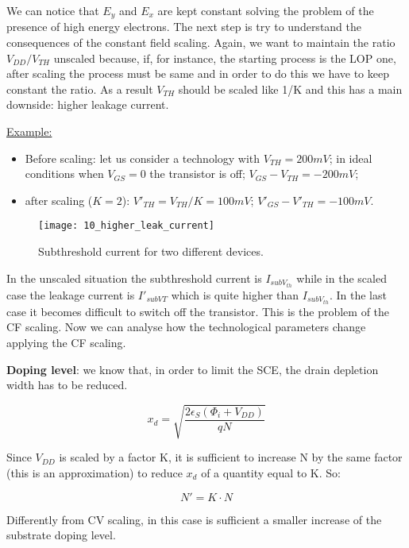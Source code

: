 \documentclass[a4paper, 12pt, twoside, openright]{report}
\begin{document}
\begin{enumerate}
We can notice that $E_{y}$ and $E_{x}$ are kept constant solving the problem of the presence of high energy electrons.
The next step is try to understand the consequences of the constant field scaling. Again, we want to maintain the ratio $V_{DD}/V_{TH}$ unscaled because, if, for instance, the starting process is the LOP one, after scaling the process must be same and in order to do this we have to keep constant the ratio. As a result $V_{TH}$ should be scaled like 1/K and this has a main downside: higher leakage current.

\underline{Example:}

	\begin{itemize}
	\item Before scaling: let us consider a technology with $V_{TH} = 200 mV$; in ideal conditions when $V_{GS} = 0$ the transistor is off; $V_{GS} - V_{TH} = -200 mV$;
	\item after scaling ($K = 2$): $V'_{TH} = V_{TH}/K = 100 mV$; $V'_{GS} - V'_{TH} = -100 mV$.
	\end{itemize}

	\begin{figure}[H]
	\centering
	\texttt{[image: 10\_higher\_leak\_current]}
	\caption{Subthreshold current for two different devices.}
	\label{}
	\end{figure}

In the unscaled situation the subthreshold current is $I_{subV_{th}}$ while in the scaled case the leakage current is $I'_{subVT}$ which is quite higher than $I_{subV_{th}}$. In the last case it becomes difficult to switch off the transistor. This is the problem of the CF scaling.
Now we can analyse how the technological parameters change applying the CF scaling.

\textbf{Doping level}: we know that, in order to limit the SCE, the drain depletion width has to be reduced.

	\begin{equation}
	x_d=\sqrt{\frac{2\epsilon_S(\Phi_i+V_{DD})}{qN}}
	\end{equation}

Since $V_{DD}$ is scaled by a factor K, it is sufficient to increase N by the same factor (this is an approximation) to reduce $x_{d}$ of a quantity equal to K. So:

	\begin{equation}
	N' = K \cdot N
	\end{equation}

Differently from CV scaling, in this case is sufficient a smaller increase of the substrate doping level.


\end{enumerate}
\end{document}
